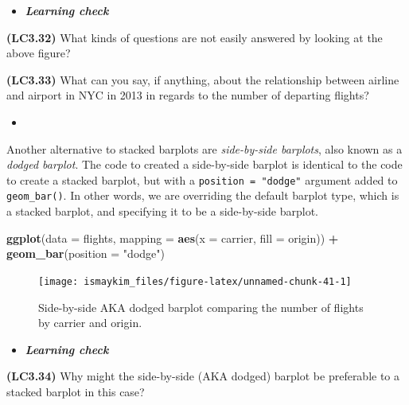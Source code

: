 \documentclass[12pt, krantz2,]{krantz}
\makeatletter
\newenvironment{Shaded}{\begin{snugshade}}{\end{snugshade}}
\newcommand{\DataTypeTok}[1]{\textcolor[rgb]{0.27,0.27,0.27}{#1}}
\newcommand{\KeywordTok}[1]{\textcolor[rgb]{0.27,0.27,0.27}{\textbf{#1}}}
\newcommand{\NormalTok}[1]{#1}
\newcommand{\OperatorTok}[1]{\textcolor[rgb]{0.43,0.43,0.43}{\textbf{#1}}}
\newcommand{\StringTok}[1]{\textcolor[rgb]{0.5,0.5,0.5}{#1}}
\newenvironment{kframe}{%
\medskip{}
\setlength{\fboxsep}{.8em}
 \def\at@end@of@kframe{}%
 \ifinner\ifhmode%
  \def\at@end@of@kframe{\end{minipage}}%
  \begin{minipage}{\columnwidth}%
 \fi\fi%
 \def\FrameCommand##1{\hskip\@totalleftmargin \hskip-\fboxsep
 \colorbox{shadecolor}{##1}\hskip-\fboxsep
     \hskip-\linewidth \hskip-\@totalleftmargin \hskip\columnwidth}%
 \MakeFramed {\advance\hsize-\width
   \@totalleftmargin\z@ \linewidth\hsize
   \@setminipage}}%
 {\par\unskip\endMakeFramed%
 \at@end@of@kframe}
\renewenvironment{Shaded}{\begin{kframe}}{\end{kframe}}
\newenvironment{rmdblock}[1]
  {\begin{shaded*}
  \begin{itemize}
  \renewcommand{\labelitemi}{
    \raisebox{-.7\height}[0pt][0pt]{
    }
  }
  \item
  }
  {
  \end{itemize}
  \end{shaded*}
  }
\newenvironment{learncheck}
  {\begin{rmdblock}{warning}}
  {\end{rmdblock}}
\makeatother
\begin{document}
\begin{learncheck}
\textbf{\emph{Learning check}}
\end{learncheck}

\textbf{(LC3.32)} What kinds of questions are not easily answered by looking at the above figure?

\textbf{(LC3.33)} What can you say, if anything, about the relationship between airline and airport in NYC in 2013 in regards to the number of departing flights?

\begin{learncheck}

\end{learncheck}

Another alternative to stacked barplots are \emph{side-by-side barplots}, also known as a \emph{dodged barplot}. The code to created a side-by-side barplot is identical to the code to create a stacked barplot, but with a \texttt{position\ =\ "dodge"} argument added to \texttt{geom\_bar()}. In other words, we are overriding the default barplot type, which is a stacked barplot, and specifying it to be a side-by-side barplot.

\begin{Shaded}
\begin{Highlighting}[]
\KeywordTok{ggplot}\NormalTok{(}\DataTypeTok{data =}\NormalTok{ flights, }\DataTypeTok{mapping =} \KeywordTok{aes}\NormalTok{(}\DataTypeTok{x =}\NormalTok{ carrier, }\DataTypeTok{fill =}\NormalTok{ origin)) }\OperatorTok{+}
\StringTok{  }\KeywordTok{geom_bar}\NormalTok{(}\DataTypeTok{position =} \StringTok{"dodge"}\NormalTok{)}
\end{Highlighting}
\end{Shaded}

\begin{figure}

{\centering \texttt{[image: ismaykim\_files/figure-latex/unnamed-chunk-41-1]} 

}

\caption{Side-by-side AKA dodged barplot comparing the number of flights by carrier and origin.}\label{fig:unnamed-chunk-41}
\end{figure}

\begin{learncheck}
\textbf{\emph{Learning check}}
\end{learncheck}

\textbf{(LC3.34)} Why might the side-by-side (AKA dodged) barplot be preferable to a stacked barplot in this case?
\end{document}
